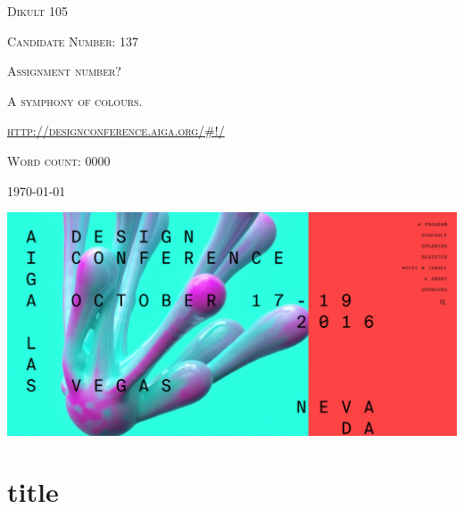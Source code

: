 \documentclass{article}
\begin{document}
	\begin{titlepage}
		\centering
		{\scshape\Large Dikult 105\par}
		\vspace{2em}
		{\scshape\large Candidate Number: 137\par}
		\vspace{6em}
		{\scshape\Large Assignment number?\par}
		{\scshape\LARGE A symphony of colours.\par}
		\vspace{1em}
		{\scshape\url{http://designconference.aiga.org/#!/}\par}
		\vfill
		{\scshape Word count: 0000\par}
		\vspace{3em}
		\large\today
	\end{titlepage}
	\cente
	\includegraphics[scale = 0.5]{frontPage}
	\section{title}
\end{document}
